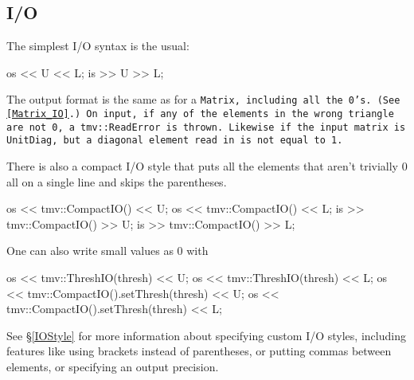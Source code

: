 \subsection{I/O}
\label{TriMatrix_IO}

The simplest I/O syntax is the usual:
\begin{tmvcode}
os << U << L;
is >> U >> L;
\end{tmvcode}
The output format is the same as for a \tt{Matrix}, including all the 0's.
(See \ref{Matrix_IO}.)  On input, if any of the elements in the wrong triangle 
are not 0, a \tt{tmv::ReadError} is thrown.  Likewise if the input matrix is
\tt{UnitDiag}, but a diagonal element read in is not equal to 1.

There is also a compact I/O style that puts all the elements that aren't trivially 0 all on a single line and skips the parentheses. 
\begin{tmvcode}
os << tmv::CompactIO() << U;
os << tmv::CompactIO() << L;
is >> tmv::CompactIO() >> U;
is >> tmv::CompactIO() >> L;
\end{tmvcode}

One can also write small values as 0 with
\begin{tmvcode}
os << tmv::ThreshIO(thresh) << U;
os << tmv::ThreshIO(thresh) << L;
os << tmv::CompactIO().setThresh(thresh) << U;
os << tmv::CompactIO().setThresh(thresh) << L;
\end{tmvcode}

See \S\ref{IOStyle} for more information about specifying custom I/O styles, including
features like using brackets instead of parentheses, or putting commas between elements,
or specifying an output precision.  
